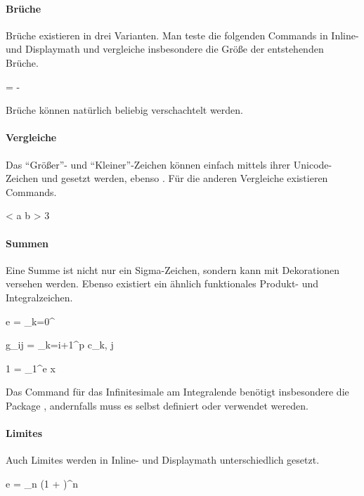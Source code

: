 \paragraph{Brüche} Brüche existieren in drei Varianten.
Man teste die folgenden Commands in Inline- und Displaymath und vergleiche insbesondere die Größe der entstehenden Brüche.
\begin{latexlisting}
	 =  - 
\end{latexlisting}
Brüche können natürlich beliebig verschachtelt werden.

\paragraph{Vergleiche} Das \enquote{Größer}- und \enquote{Kleiner}-Zeichen können einfach mittels ihrer Unicode-Zeichen \key{<} und \key{>} gesetzt werden, ebenso \key{=}.
Für die anderen Vergleiche existieren Commands.
\begin{latexlisting}
	 <  \leq a \neq b  > 3
\end{latexlisting}

\paragraph{Summen} Eine Summe ist nicht nur ein Sigma-Zeichen, sondern kann mit Dekorationen versehen werden.
Ebenso existiert ein ähnlich funktionales Produkt- und Integralzeichen.
\begin{latexlisting}
	e = \sum_{k=0}^\infty {}
\end{latexlisting}
\begin{latexlisting}
	g_{ij} = \prod_{k=i+1}^p c_{k, j}
\end{latexlisting}
\begin{latexlisting}
	1 = \int_1^e  \D x
\end{latexlisting}
Das Command  für das Infinitesimale am Integralende benötigt insbesondere die Package , andernfalls muss es selbst definiert oder  verwendet wereden.

\paragraph{Limites} Auch Limites werden in Inline- und Displaymath unterschiedlich gesetzt.
\begin{latexlisting}
	e = \lim_{n \to \infty} (1 + )^n
\end{latexlisting}


